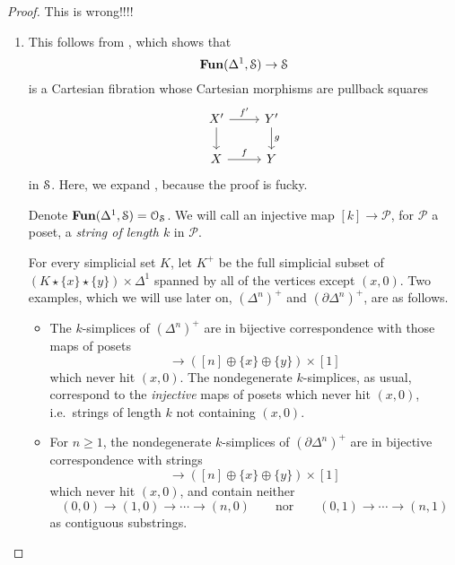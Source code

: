 \documentclass[main.tex]{subfiles}
\begin{document}
\begin{proof}
  This is wrong!!!!
  \begin{enumerate}
    \item This follows from \cite[Lem.\ 6.1.1.1]{highertopostheory}, which shows that
      \begin{equation*}
        \Fun(\Delta^{1}, \S) \to \S
      \end{equation*}
      is a Cartesian fibration whose Cartesian morphisms are pullback squares
      \begin{equation*}
        \begin{tikzcd}
          X'
          \arrow[r, "f'"]
          \arrow[d, swap]
          & Y'
          \arrow[d, "g"]
          \\
          X
          \arrow[r, "f"]
          & Y
        \end{tikzcd}
      \end{equation*}
      in $\S$. Here, we expand \cite[Lem.\ 6.1.1.1]{highertopostheory}, because the proof is fucky.

      Denote $\Fun(\Delta^{1}, \S) = \mathcal{O}_{\S}$. We will call an injective map $[k] \to \mathcal{P}$, for $\mathcal{P}$ a poset, a \emph{string of length $k$} in $\mathcal{P}$.

      For every simplicial set $K$, let $K^{+}$ be the full simplicial subset of $(K \star \{x\} \star \{y\}) \times \Delta^{1}$ spanned by all of the vertices except $(x, 0)$. Two examples, which we will use later on, $(\Delta^{n})^{+}$ and $(\partial \Delta^{n})^{+}$, are as follows.
      \begin{itemize}
        \item The $k$-simplices of $(\Delta^{n})^{+}$ are in bijective correspondence with those maps of posets
          \begin{equation*}
            [k] \to ([n] \oplus \{x\} \oplus \{y\}) \times [1]
          \end{equation*}
          which never hit $(x, 0)$. The nondegenerate $k$-simplices, as usual, correspond to the \emph{injective} maps of posets which never hit $(x, 0)$, i.e.\ strings of length $k$ not containing $(x, 0)$.

        \item For $n \geq 1$, the nondegenerate $k$-simplices of $(\partial \Delta^{n})^{+}$ are in bijective correspondence with strings
          \begin{equation*}
            [k] \to ([n] \oplus \{x\} \oplus \{y\}) \times [1]
          \end{equation*}
          which never hit $(x, 0)$, and contain neither
          \begin{equation}
            \label{eq:strings_to_avoid}
            (0, 0) \to (1, 0) \to \cdots \to (n, 0) \qquad\text{nor}\qquad (0, 1) \to \cdots \to (n, 1)
          \end{equation}
          as contiguous substrings.


\end{itemize}
\end{enumerate}
\end{proof}
\end{document}
